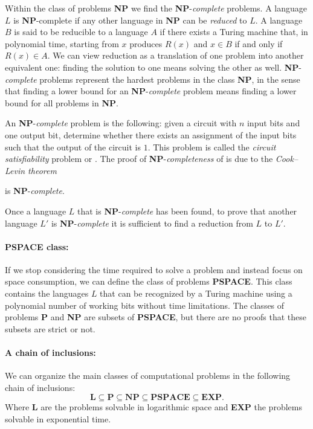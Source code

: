 Within the class of problems \textbf{NP} we find the \textbf{NP}-\emph{complete} problems. A language $L$ is \textbf{NP}-complete if any other language in \textbf{NP} can be \emph{reduced} to $L$. A language $B$ is said to be reducible to a language $A$ if there exists a Turing machine that, in polynomial time, starting from $x$ produces $R(x)$ and $x\in B$ if and only if $R(x) \in A$. We can view reduction as a translation of one problem into another equivalent one: finding the solution to one means solving the other as well. \textbf{NP}-\emph{complete} problems represent the hardest problems in the class \textbf{NP}, in the sense that finding a lower bound for an \textbf{NP}-\emph{complete} problem means finding a lower bound for all problems in \textbf{NP}.

An \textbf{NP}-\emph{complete} problem is the following: given a circuit with $n$ input bits and one output bit, determine whether there exists an assignment of the input bits such that the output of the circuit is $1$. This problem is called the \emph{circuit satisfiability} problem or . The proof of \textbf{NP}-\emph{completeness} of  is due to the \emph{Cook–Levin theorem}
\begin{theorem}
	 is \textbf{NP}-\emph{complete}.
\end{theorem}
Once a language $L$ that is \textbf{NP}-\emph{complete} has been found, to prove that another language $L'$ is \textbf{NP}-\emph{complete} it is sufficient to find a reduction from $L$ to $L'$.

\paragraph{PSPACE class:} If we stop considering the time required to solve a problem and instead focus on space consumption, we can define the class of problems \textbf{PSPACE}. This class contains the languages $L$ that can be recognized by a Turing machine using a polynomial number of working bits without time limitations. The classes of problems \textbf{P} and \textbf{NP} are subsets of \textbf{PSPACE}, but there are no proofs that these subsets are strict or not.

\paragraph{A chain of inclusions:}
We can organize the main classes of computational problems in the following chain of inclusions:
\begin{equation}
	\textbf{L} \subseteq \textbf{P} \subseteq \textbf{NP} \subseteq \textbf{PSPACE} \subseteq \textbf{EXP}.
	\label{eq:complexity_class}
\end{equation}
Where \textbf{L} are the problems solvable in logarithmic space and \textbf{EXP} the problems solvable in exponential time.

